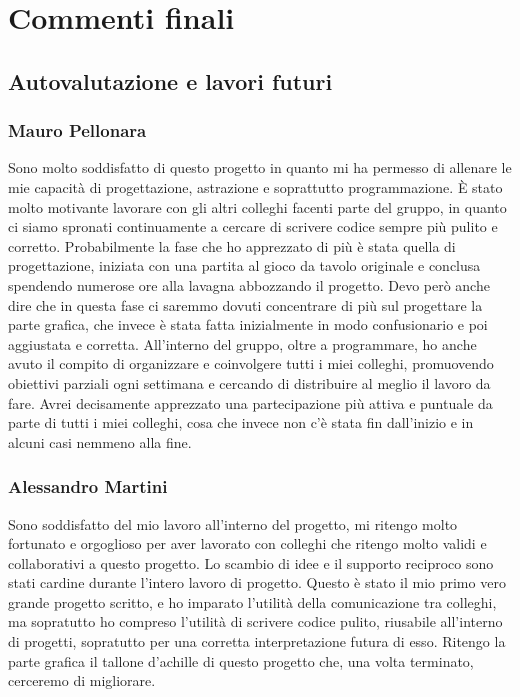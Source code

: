\section{Commenti finali}
\subsection{Autovalutazione e lavori futuri}
\subsubsection*{Mauro Pellonara}
Sono molto soddisfatto di questo progetto in quanto mi ha permesso di allenare le mie capacità di progettazione, astrazione e soprattutto programmazione. È stato molto motivante lavorare con gli altri colleghi facenti parte del gruppo, in quanto ci siamo spronati continuamente a cercare di scrivere codice sempre più pulito e corretto. Probabilmente la fase che ho apprezzato di più è stata quella di progettazione, iniziata con una partita al gioco da tavolo originale e conclusa spendendo numerose ore alla lavagna abbozzando il progetto. Devo però anche dire che in questa fase ci saremmo dovuti concentrare di più sul progettare la parte grafica, che invece è stata fatta inizialmente in modo confusionario e poi aggiustata e corretta. All'interno del gruppo, oltre a programmare, ho anche avuto il compito di organizzare e coinvolgere tutti i miei colleghi, promuovendo obiettivi parziali ogni settimana e cercando di distribuire al meglio il lavoro da fare. Avrei decisamente apprezzato una partecipazione più attiva e puntuale da parte di tutti i miei colleghi, cosa che invece non c'è stata fin dall'inizio e in alcuni casi nemmeno alla fine.

\subsubsection*{Alessandro Martini}
Sono soddisfatto del mio lavoro all'interno del progetto, mi ritengo molto fortunato e orgoglioso per aver lavorato con colleghi che ritengo molto validi e collaborativi a questo progetto.
Lo scambio di idee e il supporto reciproco sono stati cardine durante l'intero lavoro di progetto. Questo è stato il mio primo vero grande progetto scritto, e ho imparato l'utilità della comunicazione tra colleghi, ma sopratutto ho compreso l'utilità di scrivere codice pulito, riusabile all'interno di progetti, sopratutto per una corretta interpretazione futura di esso. Ritengo la parte grafica il tallone d'achille di questo progetto che, una volta terminato, cerceremo di migliorare.


